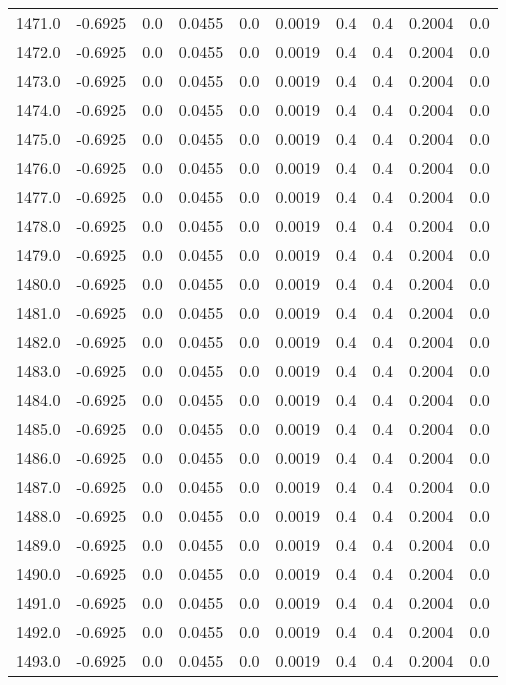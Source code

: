 \begin{longtable}{lrrrrrrrrr}
1471.0 & -0.6925 & 0.0 & 0.0455 & 0.0 & 0.0019 & 0.4 & 0.4 & 0.2004 & 0.0 \\
1472.0 & -0.6925 & 0.0 & 0.0455 & 0.0 & 0.0019 & 0.4 & 0.4 & 0.2004 & 0.0 \\
1473.0 & -0.6925 & 0.0 & 0.0455 & 0.0 & 0.0019 & 0.4 & 0.4 & 0.2004 & 0.0 \\
1474.0 & -0.6925 & 0.0 & 0.0455 & 0.0 & 0.0019 & 0.4 & 0.4 & 0.2004 & 0.0 \\
1475.0 & -0.6925 & 0.0 & 0.0455 & 0.0 & 0.0019 & 0.4 & 0.4 & 0.2004 & 0.0 \\
1476.0 & -0.6925 & 0.0 & 0.0455 & 0.0 & 0.0019 & 0.4 & 0.4 & 0.2004 & 0.0 \\
1477.0 & -0.6925 & 0.0 & 0.0455 & 0.0 & 0.0019 & 0.4 & 0.4 & 0.2004 & 0.0 \\
1478.0 & -0.6925 & 0.0 & 0.0455 & 0.0 & 0.0019 & 0.4 & 0.4 & 0.2004 & 0.0 \\
1479.0 & -0.6925 & 0.0 & 0.0455 & 0.0 & 0.0019 & 0.4 & 0.4 & 0.2004 & 0.0 \\
1480.0 & -0.6925 & 0.0 & 0.0455 & 0.0 & 0.0019 & 0.4 & 0.4 & 0.2004 & 0.0 \\
1481.0 & -0.6925 & 0.0 & 0.0455 & 0.0 & 0.0019 & 0.4 & 0.4 & 0.2004 & 0.0 \\
1482.0 & -0.6925 & 0.0 & 0.0455 & 0.0 & 0.0019 & 0.4 & 0.4 & 0.2004 & 0.0 \\
1483.0 & -0.6925 & 0.0 & 0.0455 & 0.0 & 0.0019 & 0.4 & 0.4 & 0.2004 & 0.0 \\
1484.0 & -0.6925 & 0.0 & 0.0455 & 0.0 & 0.0019 & 0.4 & 0.4 & 0.2004 & 0.0 \\
1485.0 & -0.6925 & 0.0 & 0.0455 & 0.0 & 0.0019 & 0.4 & 0.4 & 0.2004 & 0.0 \\
1486.0 & -0.6925 & 0.0 & 0.0455 & 0.0 & 0.0019 & 0.4 & 0.4 & 0.2004 & 0.0 \\
1487.0 & -0.6925 & 0.0 & 0.0455 & 0.0 & 0.0019 & 0.4 & 0.4 & 0.2004 & 0.0 \\
1488.0 & -0.6925 & 0.0 & 0.0455 & 0.0 & 0.0019 & 0.4 & 0.4 & 0.2004 & 0.0 \\
1489.0 & -0.6925 & 0.0 & 0.0455 & 0.0 & 0.0019 & 0.4 & 0.4 & 0.2004 & 0.0 \\
1490.0 & -0.6925 & 0.0 & 0.0455 & 0.0 & 0.0019 & 0.4 & 0.4 & 0.2004 & 0.0 \\
1491.0 & -0.6925 & 0.0 & 0.0455 & 0.0 & 0.0019 & 0.4 & 0.4 & 0.2004 & 0.0 \\
1492.0 & -0.6925 & 0.0 & 0.0455 & 0.0 & 0.0019 & 0.4 & 0.4 & 0.2004 & 0.0 \\
1493.0 & -0.6925 & 0.0 & 0.0455 & 0.0 & 0.0019 & 0.4 & 0.4 & 0.2004 & 0.0 \\

\end{longtable}
